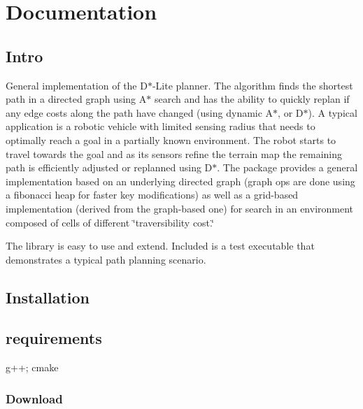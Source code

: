 \section{Documentation}\label{index_Documentation}
\subsection{Intro}\label{index_Intro}
General implementation of the D$\ast$-\/\-Lite planner. The algorithm finds the shortest path in a directed graph using A$\ast$ search and has the ability to quickly replan if any edge costs along the path have changed (using dynamic A$\ast$, or D$\ast$). A typical application is a robotic vehicle with limited sensing radius that needs to optimally reach a goal in a partially known environment. The robot starts to travel towards the goal and as its sensors refine the terrain map the remaining path is efficiently adjusted or replanned using D$\ast$. The package provides a general implementation based on an underlying directed graph (graph ops are done using a fibonacci heap for faster key modifications) as well as a grid-\/based implementation (derived from the graph-\/based one) for search in an environment composed of cells of different \char`\"{}traversibility cost.\char`\"{}

The library is easy to use and extend. Included is a test executable that demonstrates a typical path planning scenario.\subsection{Installation}\label{index_Installation}
\subsection{requirements}\label{index_Build}
g++; cmake\subsubsection{Download}\label{index_Download}


